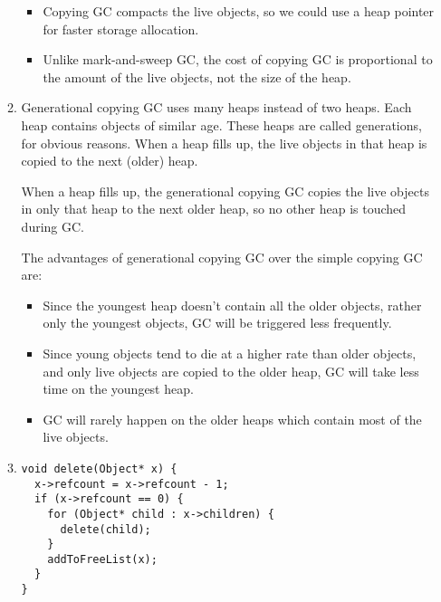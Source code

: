 \documentclass[a4paper,11pt]{article} %
\begin{document}
\begin{enumerate}
\begin{enumerate}
    \begin{itemize}
      \item Copying GC compacts the live objects, so we could use a heap pointer
      for faster storage allocation.
      \item Unlike mark-and-sweep GC, the cost of copying GC is proportional to
      the amount of the live objects, not the size of the heap.
    \end{itemize}

    \item %

    Generational copying GC uses many heaps instead of two heaps.
    Each heap contains objects of similar age. These heaps are called generations,
    for  obvious reasons. When a heap fills up, the live objects in that heap is
    copied to the next (older) heap.

    When a heap fills up, the generational copying GC copies the live objects in
    only that heap to the next older heap, so no other heap is touched during GC.

    The advantages of generational copying GC over the simple copying GC are:

    \begin{itemize}
      \item Since the youngest heap doesn't contain all the older objects, rather
      only the youngest objects, GC will be triggered less frequently.

      \item Since young objects tend to die at a higher rate than older objects,
      and only live objects are copied to the older heap, GC will take less time
      on the youngest heap.

      \item GC will rarely happen on the older heaps which contain most of the
      live objects.
    \end{itemize}

    \item %

\begin{lstlisting}
void delete(Object* x) {
  x->refcount = x->refcount - 1;
  if (x->refcount == 0) {
    for (Object* child : x->children) {
      delete(child);
    }
    addToFreeList(x);
  }
}
\end{lstlisting}
  \end{enumerate}

\end{enumerate}
\end{document}
